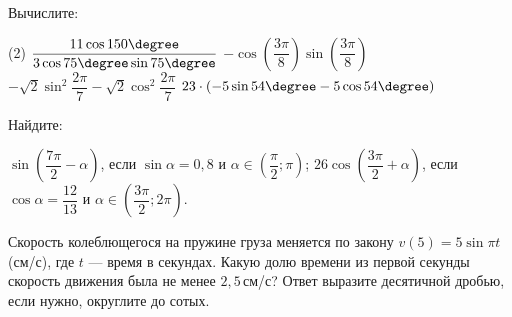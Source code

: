 \begin{homework}[number=2]
	\begin{listofex}
		\item Вычислите:
		\begin{tasks}(2)
			\task \( \dfrac{ 11\cos 150 \degree }{ 3\cos 75 \degree \sin 75 \degree } \)
			\task \( - \cos \left( \dfrac{ 3\pi }{ 8 }  \right) \sin \left( \dfrac{ 3\pi }{ 8 } \right) \)
			\task \( -\sqrt{2} \sin^2 \dfrac{ 2\pi }{ 7 } - \sqrt{2} \cos^2 \dfrac{ 2\pi }{ 7 }  \)
			\task \( 23 \cdot(-5 \sin 54 \degree - 5 \cos 54 \degree) \)
		\end{tasks}
		\item Найдите: %
		\begin{tasks}
			\task \( \sin \left( \dfrac{ 7\pi }{2  }-\alpha \right) \), если \( \sin \alpha = 0,8 \) и \( \alpha \in \left( \dfrac{ \pi }{ 2 }; \pi \right) \);
			\task \( 26 \cos \left( \dfrac{ 3\pi }{ 2 }+\alpha \right) \), если \( \cos \alpha = \dfrac{ 12 }{ 13 } \) и \( \alpha \in \left( \dfrac{ 3\pi }{ 2 }; 2 \pi \right) \).
		\end{tasks}
		\item Скорость колеблющегося на пружине груза меняется по закону \(v(5) = 5 \sin \pi t\) (см/с), где \(t\) --- время в секундах. Какую долю времени из первой секунды скорость движения была не менее \(2,5\) см/с? Ответ выразите десятичной дробью, если нужно, округлите до сотых.

	\end{listofex}
\end{homework}


